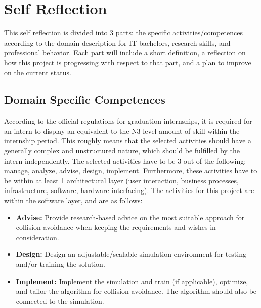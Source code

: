 \chapter{Self Reflection}
\label{ch:self_reflection}

This self reflection is divided into 3 parts: the specific activities/competences according to the domain description for IT bachelors, research skills, and professional behavior. Each part will include a short definition, a reflection on how this project is progressing with respect to that part, and a plan to improve on the current status.

\section{Domain Specific Competences}
According to the official regulations for graduation internships, it is required for an intern to display an equivalent to the N3-level amount of skill within the internship period. This roughly means that the selected activities should have a generally complex and unstructured nature, which should be fulfilled by the intern independently. The selected activities have to be 3 out of the following: manage, analyze, advise, design, implement. Furthermore, these activities have to be within at least 1 architectural layer (user interaction, business processes, infrastructure, software, hardware interfacing). The activities for this project are within the software layer, and are as follows:
\begin{itemize}
	\setlength\itemsep{-0.5em}
	\item \textbf{Advise:} Provide research-based advice on the most suitable approach for collision avoidance when keeping the requirements and wishes in consideration. 
	\item\textbf{Design:} Design an adjustable/scalable simulation environment for testing and/or training the solution.
	\item \textbf{Implement:} Implement the simulation and train (if applicable), optimize, and tailor the algorithm for collision avoidance. The algorithm should also be connected to the simulation.
\end{itemize}


